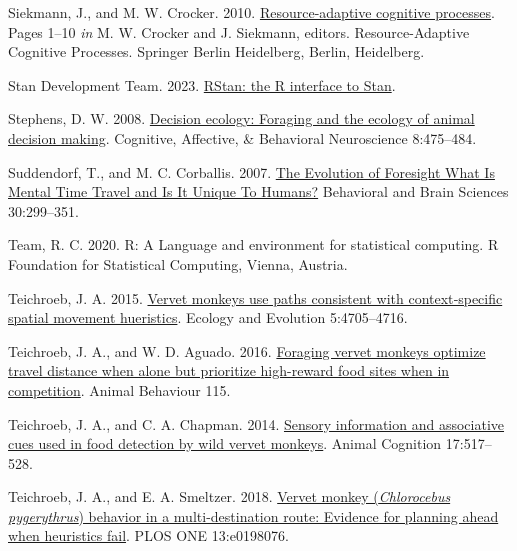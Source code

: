 \documentclass[twoside,12pt,final]{ucthesis-CA2012}
\newenvironment{CSLReferences}%
  {}%
  {\par}
\begin{document}
\begin{ucmainmatter}
\begin{CSLReferences}{1}{0}
\leavevmode{}%
Siekmann, J., and M. W. Crocker. 2010. \href{https://doi.org/10.1007/978-3-540-89408-7}{Resource-adaptive cognitive processes}. Pages 1--10 \emph{in} M. W. Crocker and J. Siekmann, editors. Resource-Adaptive Cognitive Processes. Springer Berlin Heidelberg, Berlin, Heidelberg.

\leavevmode{}%
Stan Development Team. 2023. \href{https://mc-stan.org/}{RStan: the R interface to Stan}.

\leavevmode{}%
Stephens, D. W. 2008. \href{https://doi.org/10.3758/CABN.8.4.475}{Decision ecology: Foraging and the ecology of animal decision making}. Cognitive, Affective, \& Behavioral Neuroscience 8:475--484.

\leavevmode{}%
Suddendorf, T., and M. C. Corballis. 2007. \href{https://doi.org/10.1017/S0140525X07001975}{The Evolution of Foresight What Is Mental Time Travel and Is It Unique To Humans?} Behavioral and Brain Sciences 30:299--351.

\leavevmode{}%
Team, R. C. 2020. R: A Language and environment for statistical computing. R Foundation for Statistical Computing, Vienna, Austria.

\leavevmode{}%
Teichroeb, J. A. 2015. \href{https://doi.org/10.1002/ece3.1755}{Vervet monkeys use paths consistent with context‐specific spatial movement hueristics}. Ecology and Evolution 5:4705--4716.

\leavevmode{}%
Teichroeb, J. A., and W. D. Aguado. 2016. \href{https://doi.org/10.1016/j.anbehav.2016.02.020}{Foraging vervet monkeys optimize travel distance when alone but prioritize high-reward food sites when in competition}. Animal Behaviour 115.

\leavevmode{}%
Teichroeb, J. A., and C. A. Chapman. 2014. \href{https://doi.org/10.1007/s10071-013-0683-2}{Sensory information and associative cues used in food detection by wild vervet monkeys}. Animal Cognition 17:517--528.

\leavevmode{}%
Teichroeb, J. A., and E. A. Smeltzer. 2018. \href{https://doi.org/10.1371/journal.pone.0198076}{Vervet monkey (\emph{Chlorocebus pygerythrus}) behavior in a multi-destination route: Evidence for planning ahead when heuristics fail}. PLOS ONE 13:e0198076.


\end{CSLReferences}
\end{ucmainmatter}
\end{document}
